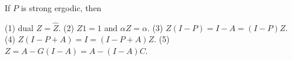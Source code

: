 If $P$ is strong ergodic, then

(1) dual $Z = \hat{Z}$.
(2) $Z1 = 1$ and $\alpha Z = \alpha$.
(3) $Z(I - P) = I - A = (I - P)Z$.
(4) $Z(I - P + A) = I = (I - P + A)Z$.
(5) $Z = A - G(I - A) = A - (I - A)C$.
